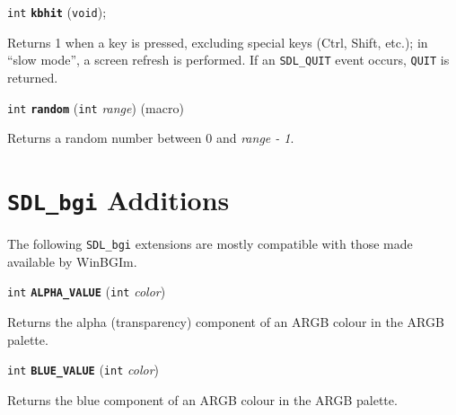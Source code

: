 \documentclass[a4paper,12pt]{article}
\newcommand{\SDLbgi}{\texttt{SDL\_bgi}}
\newcommand{\V}{\texttt{void}}      %
\newcommand{\I}{\texttt{int}}       %
\newcommand{\func}[1]{\textbf{\texttt{#1}}}  %
\newcommand{\A}[1]{\emph{#1}}       %
\newcommand{\T}[1]{\texttt{#1}}     %
\newenvironment{bgi}
{ %
  \begin{snugshade}
}
{ %
  \end{snugshade}
}
\begin{document}

\label{sec:kbhit}

\begin{bgi}
\I{} \func{kbhit} (\V{});
\end{bgi}

Returns 1 when a key is pressed, excluding special keys (Ctrl, Shift,
etc.); in ``slow mode'', a screen refresh is performed. If an
\T{SDL\_QUIT} event occurs, \T{QUIT} is returned.


\label{sec:random}

\begin{bgi}
\I{} \func{random} (\I{} \A{range}) (macro)
\end{bgi}

Returns a random number between 0 and \A{range - 1}.



\section{\SDLbgi{} Additions}

The following \SDLbgi{} extensions are mostly compatible with those
made available by WinBGIm.


\label{sec:ALPHAVALUE}

\begin{bgi}
\I{} \func{ALPHA\_VALUE} (\I{} \A{color})
\end{bgi}

Returns the alpha (transparency) component of an ARGB colour in the
ARGB palette.


\label{sec:BLUEVALUE}

\begin{bgi}
\I{} \func{BLUE\_VALUE} (\I{} \A{color})
\end{bgi}

Returns the blue component of an ARGB colour in the ARGB palette.


\label{sec:COLOR}
\end{document}

